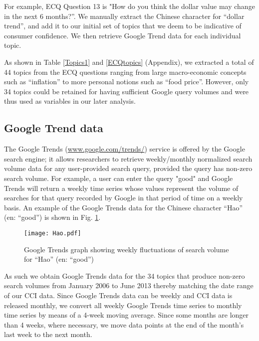 \documentclass[10pt]{article}
\begin{document}
	For example, ECQ Question 13 is "How do you think the dollar value may change in the next 6 months?''. We manually extract the Chinese character for
	``dollar trend'', and add it to our initial set of topics that we deem to be indicative of consumer confidence. We then retrieve Google Trend data for each individual topic.

	As shown in Table \ref{Topics1} and \ref{ECQtopics} (Appendix), we extracted a total of 44 topics  from the ECQ questions ranging from large	macro-economic concepts
	such as ``inflation'' to more personal notions such as ``food price''. However, only 34 topics could be retained for having sufficient Google query volumes and were
	thus used as variables in our later analysis.
	
	
	\subsection*{Google Trend data}
	
	The Google Trends (\url{www.google.com/trends/}) service is offered by the Google search engine; it allows researchers to retrieve weekly/monthly normalized search volume data
	for any user-provided search query, provided the query has non-zero search volume. 
	For example, a user can enter the query "good" and Google Trends will return a weekly time series whose
	values represent the volume of searches for that query recorded by Google in that period of time on a weekly basis.
	An example of the Google Trends data for  the Chinese character ``Hao'' (en: ``good'') is shown in Fig. \ref{googletrendshoa}.
		
	\begin{figure}[h!]
		\begin{center}
			\texttt{[image: Hao.pdf]}
			\caption{ \label{googletrendshoa} Google Trends graph showing weekly fluctuations of search volume for ``Hao'' (en: ``good'')}
		\end{center}
	\end{figure}
	
	As such we obtain Google Trends data for the 34 topics that produce non-zero search volumes from January 2006 to June 2013 thereby matching the date range of our CCI data.
	Since Google Trends data can be weekly and CCI data is released monthly, we convert all weekly Google Trends time series to monthly time series by 
	means of a 4-week moving average. Since some months are longer than 4 weeks, where necessary, we move data points at the end of the month's last week to the next month.
	
\end{document}
